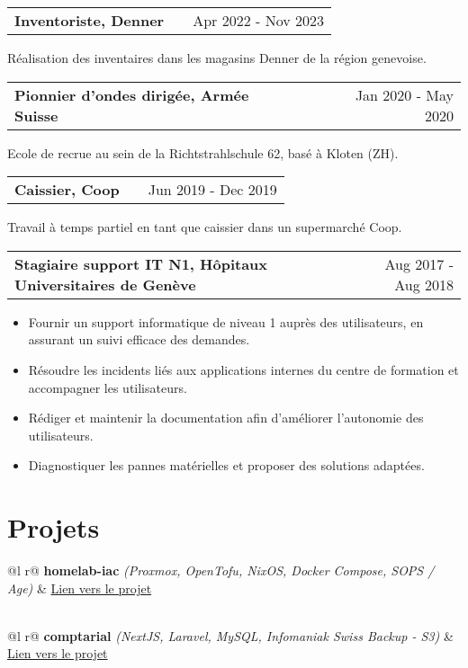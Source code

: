 \documentclass[a4paper,11pt]{article}
\makeatletter
\newenvironment{jobshort}[2]
    {
    \begin{tabularx}{\linewidth}{@{}l X r@{}}
    \textbf{#1} & \hfill &  #2 \\[3.75pt]
    \end{tabularx}
    }
    {
    }
\newenvironment{joblong}[2]
    {
    \begin{tabularx}{\linewidth}{@{}l X r@{}}
    \textbf{#1} & \hfill &  #2 \\[3.75pt]
    \end{tabularx}
    \begin{minipage}[t]{\linewidth}
    \begin{itemize}[nosep,after=\strut, leftmargin=1em, itemsep=3pt,label=--]
    }
    {
    \end{itemize}
    \end{minipage}
    }
\makeatother
\begin{document}
\begin{jobshort}{Inventoriste, Denner}{Apr 2022 - Nov 2023}
    Réalisation des inventaires dans les magasins Denner de la région genevoise.
\end{jobshort}

\begin{jobshort}{Pionnier d’ondes dirigée, Armée Suisse}{Jan 2020 - May 2020}
    Ecole de recrue au sein de la Richtstrahlschule 62, basé à Kloten (ZH).
\end{jobshort}

\begin{jobshort}{Caissier, Coop}{Jun 2019 - Dec 2019}
    Travail à temps partiel en tant que caissier dans un supermarché Coop.
\end{jobshort}

\begin{joblong}{Stagiaire support IT N1, Hôpitaux Universitaires de Genève}{Aug 2017 - Aug 2018}
\item Fournir un support informatique de niveau 1 auprès des utilisateurs, en assurant un suivi efficace des demandes.
\item Résoudre les incidents liés aux applications internes du centre de formation et accompagner les utilisateurs.
\item Rédiger et maintenir la documentation afin d’améliorer l’autonomie des utilisateurs.
\item Diagnostiquer les pannes matérielles et proposer des solutions adaptées.
\end{joblong}

\section{Projets}

\begin{tabularx}{\linewidth}{ @{}l r@{} }
\textbf{homelab-iac} \textit{(Proxmox, OpenTofu, NixOS, Docker Compose, SOPS / Age)} & \hfill \href{https://boranuzun.github.io/homelab-docs}{Lien vers le projet} \\[3.75pt]
  \\
\end{tabularx}

\begin{tabularx}{\linewidth}{ @{}l r@{} }
\textbf{comptarial} \textit{(NextJS, Laravel, MySQL, Infomaniak Swiss Backup - S3)} & \hfill \href{https://github.com/heg-comptarial/comptarial}{Lien vers le projet} \\[3.75pt]
  \\
\end{tabularx}
\end{document}
